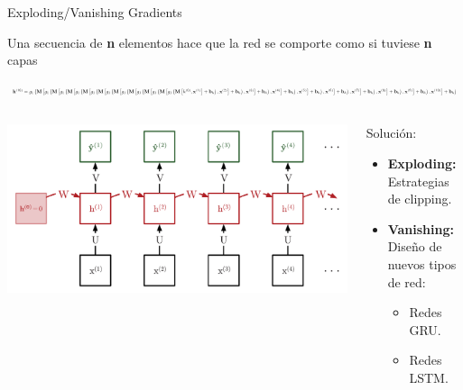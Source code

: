 \documentclass[aspectratio=169]{beamer}
\begin{document}
\begin{frame}{Exploding/Vanishing Gradients}
	\begin{block}{}
		\centering
		Una secuencia de \textbf{n} elementos hace que la red se comporte como si tuviese \textbf{n} capas
	\end{block}
	\vspace{-1.5em}
	\begin{equation*}
		\scalebox{0.445}{ %
		  $\mathbf{h}^{(10)}=g_1\left(\mathbf{M}\left[g_1\left(\mathbf{M}\left[g_1\left(\mathbf{M}\left[g_1\left(\mathbf{M}\left[g_1\left(\mathbf{M}\left[g_1\left(\mathbf{M}\left[g_1\left(\mathbf{M}\left[g_1\left(\mathbf{M}\left[g_1\left(\mathbf{M}\left[g_1\left(\mathbf{M}\left[h^{(0)}, \mathbf{x}^{(1)}\right]+\mathbf{b}_h\right), \mathbf{x}^{(2)}\right]+\mathbf{b}_h\right), \mathbf{x}^{(3)}\right]+\mathbf{b}_h\right), \mathbf{x}^{(4)}\right]+\mathbf{b}_h\right), \mathbf{x}^{(5)}\right]+\mathbf{b}_h\right), \mathbf{x}^{(6)}\right]+\mathbf{b}_h\right), \mathbf{x}^{(7)}\right]+\mathbf{b}_h\right), \mathbf{x}^{(8)}\right]+\mathbf{b}_h\right), \mathbf{x}^{(9)}\right]+\mathbf{b}_h\right), \mathbf{x}^{(10)}\right]+\mathbf{b}_h\right)$
		}
	\end{equation*}
	\begin{columns}
		\begin{column}{0.45\textwidth}
			\includegraphics[width=.8\textwidth]{imgs/tema4/rnn/DESP1.pdf}
		\end{column}

		\begin{column}{0.55\textwidth}
			Solución:
			\begin{itemize}
				\item \textbf{Exploding:} Estrategias de clipping.
				\item \textbf{Vanishing:} Diseño de nuevos tipos de red:
				\begin{itemize}
					\item Redes GRU.
					\item Redes LSTM.
				\end{itemize}
			\end{itemize}
		\end{column}
	\end{columns}

\end{frame}
\end{document}
